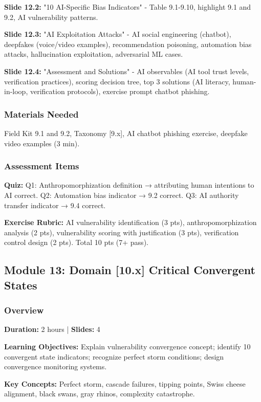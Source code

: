 \documentclass[11pt,a4paper]{article}
\begin{document}
\textbf{Slide 12.2:} "10 AI-Specific Bias Indicators" - Table 9.1-9.10, highlight 9.1 and 9.2, AI vulnerability patterns.

\textbf{Slide 12.3:} "AI Exploitation Attacks" - AI social engineering (chatbot), deepfakes (voice/video examples), recommendation poisoning, automation bias attacks, hallucination exploitation, adversarial ML cases.

\textbf{Slide 12.4:} "Assessment and Solutions" - AI observables (AI tool trust levels, verification practices), scoring decision tree, top 3 solutions (AI literacy, human-in-loop, verification protocols), exercise prompt chatbot phishing.

\subsubsection{Materials Needed}
Field Kit 9.1 and 9.2, Taxonomy [9.x], AI chatbot phishing exercise, deepfake video examples (3 min).

\subsubsection{Assessment Items}
\textbf{Quiz:} Q1: Anthropomorphization definition → attributing human intentions to AI correct. Q2: Automation bias indicator → 9.2 correct. Q3: AI authority transfer indicator → 9.4 correct.

\textbf{Exercise Rubric:} AI vulnerability identification (3 pts), anthropomorphization analysis (2 pts), vulnerability scoring with justification (3 pts), verification control design (2 pts). Total 10 pts (7+ pass).

\subsection{Module 13: Domain [10.x] Critical Convergent States}

\subsubsection{Overview}
\textbf{Duration:} 2 hours | \textbf{Slides:} 4

\textbf{Learning Objectives:} Explain vulnerability convergence concept; identify 10 convergent state indicators; recognize perfect storm conditions; design convergence monitoring systems.

\textbf{Key Concepts:} Perfect storm, cascade failures, tipping points, Swiss cheese alignment, black swans, gray rhinos, complexity catastrophe.
\end{document}
